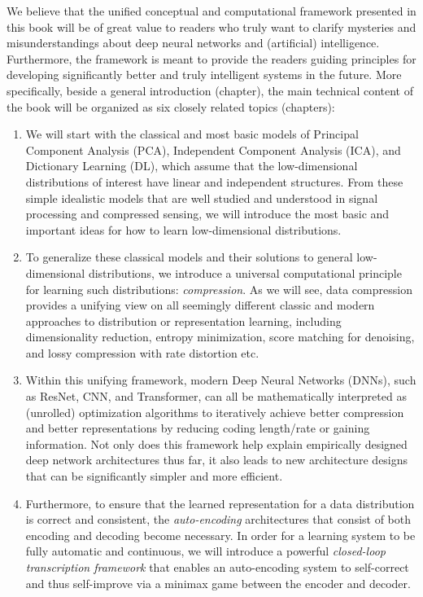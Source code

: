 \documentclass[../../book-main.tex]{subfiles}
\begin{document}
We believe that the unified conceptual and computational framework presented in this book will be of great value to readers who truly want to clarify mysteries and misunderstandings about deep neural networks and (artificial) intelligence. Furthermore, the framework is meant to provide the readers guiding principles for developing significantly better and truly intelligent systems in the future. More specifically, beside a general introduction (chapter), the main technical content of the book will be organized as six closely related topics (chapters):
\begin{enumerate}
\item We will start with the classical and most basic models of Principal Component Analysis (PCA), Independent Component Analysis (ICA), and Dictionary Learning (DL), which assume that the low-dimensional distributions of interest have linear and independent structures. From these simple idealistic models that are well studied and understood in signal processing and compressed sensing, we will introduce the most basic and important ideas for how to learn low-dimensional distributions.

\item To generalize these classical models and their solutions to general low-dimensional distributions, we introduce a universal computational principle for learning such distributions: {\em compression}. As we will see, data compression provides a unifying view on all seemingly different classic and modern approaches to distribution or representation learning, including dimensionality reduction,  entropy minimization, score matching for denoising, and lossy compression with rate distortion etc. 

\item Within this unifying framework, modern Deep Neural Networks (DNNs), such as ResNet, CNN, and Transformer, can all be mathematically interpreted as (unrolled) optimization algorithms to iteratively achieve better compression and better representations by reducing coding length/rate or gaining information. Not only does this framework help explain empirically designed deep network architectures thus far, it also leads to new architecture designs that can be significantly simpler and more efficient.

\item Furthermore, to ensure that the learned representation for a data distribution is correct and consistent, the {\em auto-encoding} architectures that consist of both encoding and decoding become necessary. In order for a learning system to be fully automatic and continuous, we will introduce a powerful {\em closed-loop transcription framework} that enables an auto-encoding system to self-correct and thus self-improve via a minimax game between the encoder and decoder.  


\end{enumerate}
\end{document}
